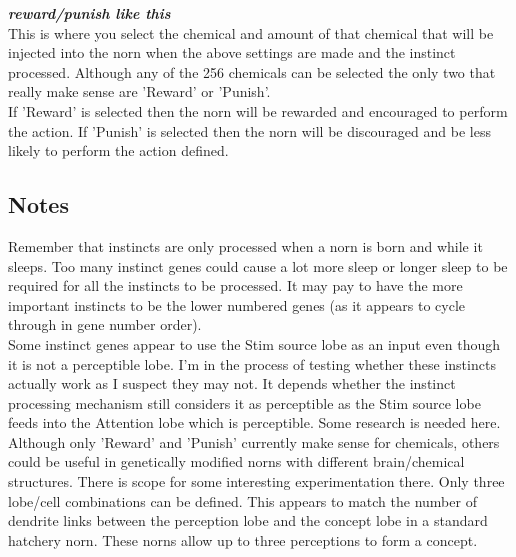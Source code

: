 \documentclass[11pt,twoside,a4paper]{article}
\begin{document}
\textbf{\textit{reward/punish like this}}~\\
This is where you select the chemical and amount of that chemical that will be injected into the norn when the above settings are made and the instinct processed. Although any of the 256 chemicals can be selected the only two that really make sense are 'Reward' or 'Punish'.~\\

If 'Reward' is selected then the norn will be rewarded and encouraged to perform the action. If 'Punish' is selected then the norn will be discouraged and be less likely to perform the action defined.

\subsection{Notes}

Remember that instincts are only processed when a norn is born and while it sleeps. Too many instinct genes could cause a lot more sleep or longer sleep to be required for all the instincts to be processed. It may pay to have the more important instincts to be the lower numbered genes (as it appears to cycle through in gene number order).~\\

Some instinct genes appear to use the Stim source lobe as an input even though it is not a perceptible lobe. I'm in the process of testing whether these instincts actually work as I suspect they may not. It depends whether the instinct processing mechanism still considers it as perceptible as the Stim source lobe feeds into the Attention lobe which is perceptible. Some research is needed here.~\\

Although only 'Reward' and 'Punish' currently make sense for chemicals, others could be useful in genetically modified norns with different brain/chemical structures. There is scope for some interesting experimentation there. Only three lobe/cell combinations can be defined. This appears to match the number of dendrite links between the perception lobe and the concept lobe in a standard hatchery norn. These norns allow up to three perceptions to form a concept.~\\


\end{document}
